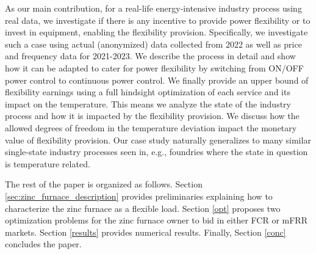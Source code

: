 \documentclass[conference]{IEEEtran}
\begin{document}

As our main contribution, for a real-life energy-intensive industry process using real data, we investigate if there is any incentive to provide power flexibility or to invest in equipment, enabling the flexibility provision.
%
Specifically, we investigate such a case using actual (anonymized) data collected from 2022 as well as price and frequency data for 2021-2023. We describe the process in detail and show how it can be adapted to cater for power flexibility by switching from ON/OFF power control to continuous power control.
We finally provide an upper bound of flexibility earnings using a full hindsight optimization of each service and its impact on the temperature. This means we analyze the state of the industry process and how it is impacted by the flexibility provision. We discuss how the allowed degrees of freedom in the temperature deviation impact the monetary value of flexibility provision.
Our case study naturally generalizes to many similar single-state industry processes seen in, e.g., foundries where the state in question is temperature related.


The rest of the paper is organized as follows. 
Section \ref{sec:zinc_furnace_description} provides preliminaries explaining how to characterize the zinc furnace as a flexible load.
Section \ref{opt} proposes two optimization problems for the zinc furnace owner to bid in either FCR or mFRR markets. Section \ref{results} provides numerical results. Finally, Section \ref{conc} concludes the paper.


\end{document}
